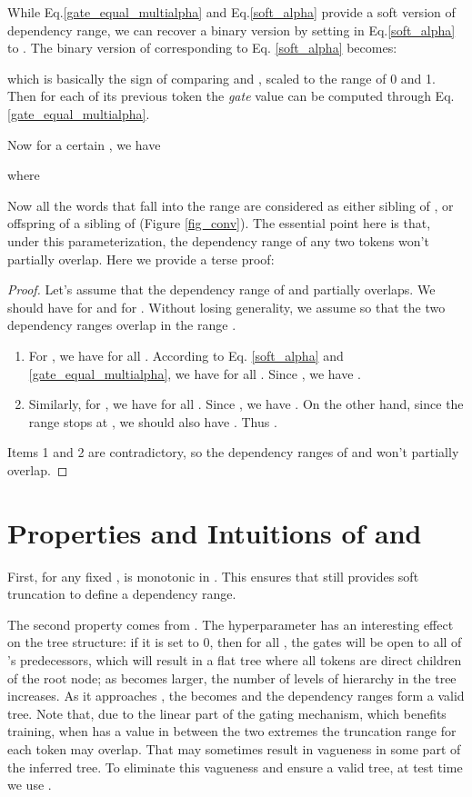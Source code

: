 \documentclass{article} \usepackage{iclr2018_conference,times}
\begin{document}
While Eq.\ref{gate_equal_multialpha} and Eq.\ref{soft_alpha} provide a soft version of dependency range, we can recover a binary version by setting  in Eq.\ref{soft_alpha} to . The binary version of  corresponding to Eq. \ref{soft_alpha} becomes:

which is basically the sign of comparing  and , scaled to the range of 0 and 1. Then for each of its previous token the \emph{gate} value  can be computed through Eq.\ref{gate_equal_multialpha}. 

Now for a certain , we have 

where

Now all the words that fall into the range  are considered as either sibling of , or offspring of a sibling of  (Figure \ref{fig_conv}). The essential point here is that, under this parameterization, the dependency range of any two tokens won't partially overlap. Here we provide a terse proof:

\begin{proof}
Let's assume that the dependency range of  and  partially overlaps. We should have 
 for  and  for . Without losing generality, we assume 
 so that the two dependency ranges overlap in the range . 
\begin{enumerate}
\item For , we have  for all . According to Eq. \ref{soft_alpha} and \ref{gate_equal_multialpha}, we have  for all . Since , we have .
\item Similarly, for , we have  for all . Since , we have . On the other hand, since the range stops at , we should also have . Thus .
\end{enumerate}
Items 1 and 2 are contradictory, so the dependency ranges of  and  won't partially overlap.
\end{proof}

\section{Properties and Intuitions of  and } 
\label{gd_properties}
First, for any fixed ,  is monotonic in . This ensures that  still provides soft truncation to define a dependency range. 

The second property comes from . The hyperparameter  has an interesting effect on the tree structure: if it is set to 0, then for all , the gates  will be open to all of 's predecessors, which will result in a flat tree where all tokens are direct children of the root node; as  becomes larger, the number of levels of hierarchy in the tree increases. As it approaches , the  becomes  and the dependency ranges form a valid tree. Note that, due to the linear part of the gating mechanism, which benefits training, when  has a value in between the two extremes the truncation range for each token may overlap. That may sometimes result in vagueness in some part of the inferred tree. To eliminate this vagueness and ensure a valid tree, at test time we use .
\end{document}
